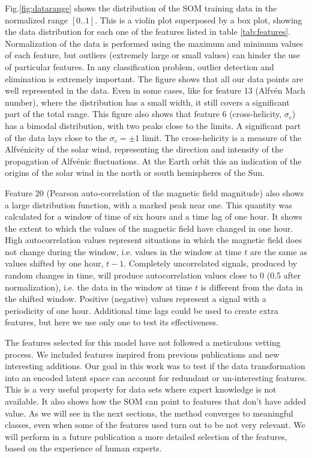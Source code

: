 Fig.\ref{fig:datarange} shows the distribution of the SOM training data in the normalized range $\left[0..1\right]$. This is a violin plot superposed by a box plot, showing the data distribution for each one of the features listed in table \ref{tab:features}. Normalization of the data is performed using the maximum and minimum values of each feature, but outliers (extremely large or small values) can hinder the use of particular features. In any classification problem, outlier detection and elimination is extremely important. The figure shows that all our data points are well represented in the data. Even in some cases, like for feature 13 (Alfv\'en Mach number), where the distribution has a small width, it still covers a significant part of the total range. This figure also shows that feature 6 (cross-helicity, $\sigma_c$) has a bimodal distribution, with two peaks close to the limits. A significant part of the data lays close to the $\sigma_c = \pm 1$ limit. The cross-helicity is a measure of the Alfv\'enicity of the solar wind, representing the direction and intensity of the propagation of Alfv\'enic fluctuations. At the Earth orbit this an indication of the origins of the solar wind in the north or south hemispheres of the Sun.

Feature 20 (Pearson auto-correlation of the magnetic field magnitude) also shows a large distribution function, with a marked peak near one. This quantity was calculated for a window of time of six hours and a time lag of one hour. It shows the extent to which the values of the magnetic field have changed in one hour. High autocorrelation values represent situations in which the magnetic field does not change during the window, i.e. values in the window at time $t$ are the same as values shifted by one hour, $t-1$. Completely uncorrelated signals, produced by random changes in time, will produce autocorrelation values close to 0 (0.5 after normalization), i.e. the data in the window at time $t$ is different from the data in the shifted window. Positive (negative) values represent a signal with a periodicity of one hour. Additional time lags could be used to create extra features, but here we use only one to test its effectiveness.

The features selected for this model have not followed a meticulous vetting process. We included features inspired from previous publications and new interesting additions. Our goal in this work was to test if the data transformation into an encoded latent space can account for redundant or un-interesting features. This is a very useful property for data sets where expert knowledge is not available. It also shows how the SOM can point to features that don't have added value. As we will see in the next sections, the method converges to meaningful classes, even when some of the features used turn out to be not very relevant. We will perform in a future publication a more detailed selection of the features, based on the experience of human experts. 

